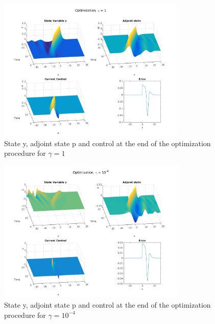 \begin{figure}[!h]
 \includegraphics[width = 0.8\textwidth]{images/gamma1results.png}
 \caption{State y, adjoint state p and control at the end of the optimization procedure for $\gamma = 1$}
\end{figure}

% 

\begin{figure}[!h]
 \includegraphics[width = 0.8\textwidth]{images/gamma10000results.png}
 \caption{State y, adjoint state p and control at the end of the optimization procedure for $\gamma = 10^{-4}$}
\end{figure}







